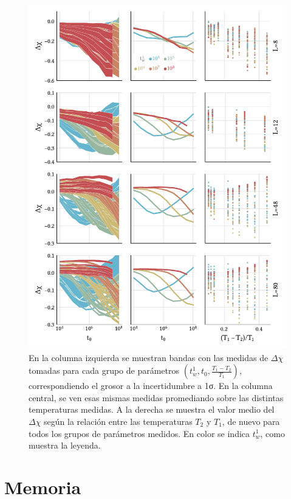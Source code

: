 \documentclass[11pt]{report}
\begin{document}
\begin{figure}
  \centering
  \includegraphics{../study_cases/trejanalysis/1D_dependence.pdf}
  \caption{En la columna izquierda se muestran bandas con las medidas
    de $Δχ$ tomadas para cada grupo de parámetros
    $(t_w^1, t_0, \frac{T_1-T_2}{T_1})$, correspondiendo el grosor a
    la incertidumbre a 1σ. En la columna central, se ven esas mismas
    medidas promediando sobre las distintas temperaturas medidas. A la
    derecha se muestra el valor medio del $Δχ$ según la relación entre
    las temperaturas $T_2$ y $T_1$, de nuevo para todos los grupos de
    parámetros medidos. En color se indica $t_w^1$, como muestra la
    leyenda.}
  \label{fig:trejanalysis}
\end{figure}


\section{Memoria}
\end{document}

